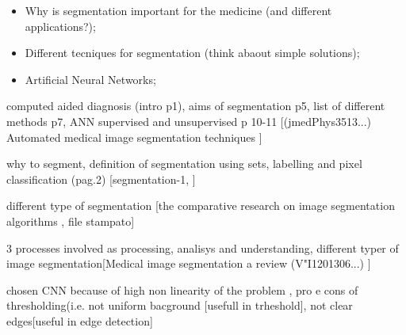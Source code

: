 \documentclass[../main.tex]{subfiles}
\begin{document}
\begin{itemize}

    \item Why is segmentation important for the medicine (and different applications?);
    \item Different tecniques for segmentation (think abaout simple solutions);
    \item Artificial Neural Networks;
   
\end{itemize}
computed aided diagnosis (intro p1), aims of segmentation p5, list of different methods p7, ANN supervised and unsupervised p 10-11 [(jmedPhys3513...) Automated medical image segmentation techniques \cite{automated_segm_tech}]

why to segment, definition of segmentation using sets, labelling and pixel classification  (pag.2) [segmentation-1, \cite{sgmentation_1_survey}]

different type of segmentation [the comparative research on image segmentation algorithms , file stampato]

3 processes involved as processing, analisys and understanding, different typer of image segmentation[Medical image segmentation a review (V"I1201306...) \cite{segmentation_review_1}]


chosen CNN because of high non linearity of the problem , pro e cons of thresholding(i.e. not uniform bacground [usefull in trheshold], not clear edges[useful in edge detection]
\end{document}
